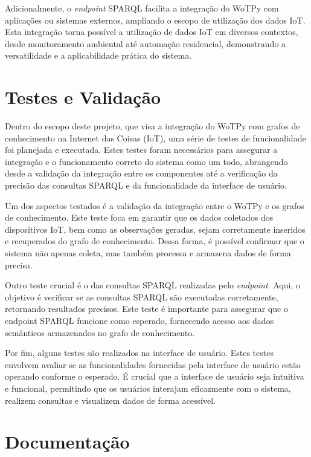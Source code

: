 Adicionalmente, o \textit{endpoint} SPARQL facilita a integração do WoTPy com aplicações ou sistemas externos, ampliando o escopo de utilização dos dados IoT. Esta integração torna possível a utilização de dados IoT em diversos contextos, desde monitoramento ambiental até automação residencial, demonstrando a versatilidade e a aplicabilidade prática do sistema.

\section{Testes e Validação}

Dentro do escopo deste projeto, que visa a integração do WoTPy com grafos de conhecimento na Internet das Coisas (IoT), uma série de testes de funcionalidade foi planejada e executada. Estes testes foram necessários para assegurar a integração e o funcionamento correto do sistema como um todo, abrangendo desde a validação da integração entre os componentes até a verificação da precisão das consultas SPARQL e da funcionalidade da interface de usuário.

Um dos aspectos testados é a validação da integração entre o WoTPy e os grafos de conhecimento. Este teste foca em garantir que os dados coletados dos dispositivos IoT, bem como as observações geradas, sejam corretamente inseridos e recuperados do grafo de conhecimento. Dessa forma, é possível confirmar que o sistema não apenas coleta, mas também processa e armazena dados de forma precisa.

Outro teste crucial é o das consultas SPARQL realizadas pelo \textit{endpoint}. Aqui, o objetivo é verificar se as consultas SPARQL são executadas corretamente, retornando resultados precisos. Este teste é importante para assegurar que o endpoint SPARQL funcione como esperado, fornecendo acesso aos dados semânticos armazenados no grafo de conhecimento.

Por fim, alguns testes são realizados na interface de usuário. Estes testes envolvem avaliar se as funcionalidades fornecidas pela interface de usuário estão operando conforme o esperado. É crucial que a interface de usuário seja intuitiva e funcional, permitindo que os usuários interajam eficazmente com o sistema, realizem consultas e visualizem dados de forma acessível.

\section{Documentação}

